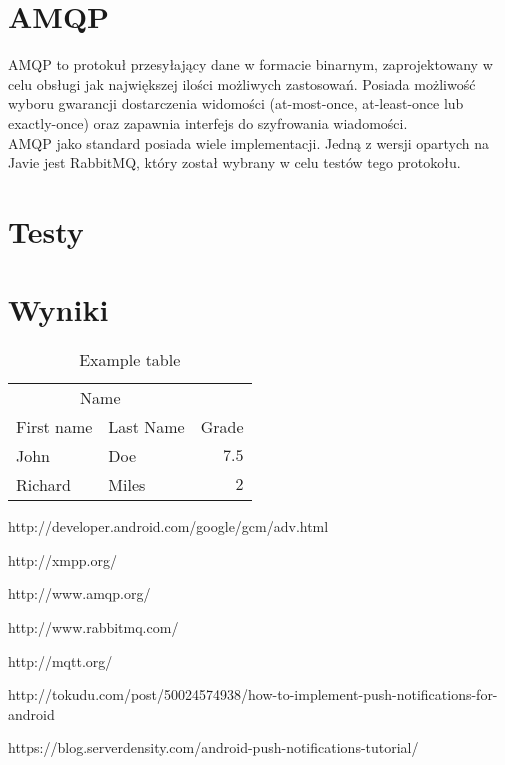 \documentclass[twoside]{article}
\begin{document}
\begin{multicols}{2}
\section{AMQP}
AMQP to protokuł przesyłający dane w formacie binarnym, zaprojektowany w celu obsługi jak największej ilości możliwych zastosowań. Posiada możliwość wyboru gwarancji dostarczenia widomości (at-most-once, at-least-once lub exactly-once) oraz zapawnia interfejs do szyfrowania wiadomości.
\\ AMQP jako standard posiada wiele implementacji. Jedną z wersji opartych na Javie jest RabbitMQ, który został wybrany w celu testów tego protokołu.

\section{Testy}

\section{Wyniki}
\begin{table}[H]
\caption{Example table}
\centering
\begin{tabular}{llr}
\toprule
\multicolumn{2}{c}{Name} \\
\cmidrule(r){1-2}
First name & Last Name & Grade \\
\midrule
John & Doe & $7.5$ \\
Richard & Miles & $2$ \\
\bottomrule
\end{tabular}
\end{table}


\begin{thebibliography}{99}

http://developer.android.com/google/gcm/adv.html

\bibitem[XMPP]{}
http://xmpp.org/

\bibitem[AMQP]{}
http://www.amqp.org/

\bibitem[RabbitMQ]{}
http://www.rabbitmq.com/

\bibitem[MQTT]{}
http://mqtt.org/

http://tokudu.com/post/50024574938/how-to-implement-push-notifications-for-android

https://blog.serverdensity.com/android-push-notifications-tutorial/

\end{thebibliography}


\end{multicols}
\end{document}
